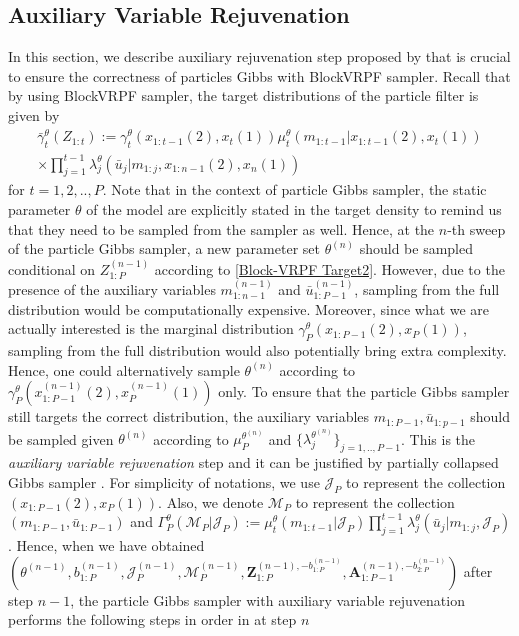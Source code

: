 \documentclass[12pt,a4paper]{article}
\begin{document}
\subsection{Auxiliary Variable Rejuvenation}
In this section, we describe auxiliary rejuvenation step proposed by \cite{finke2014static} that is crucial to ensure the correctness of particles Gibbs with BlockVRPF sampler. Recall that by using BlockVRPF sampler, the target distributions of the particle filter is given by 
\begin{multline}
    \label{Block-VRPF Target2}
    \bar{\gamma}_t^{\theta}\left(Z_{1:t}\right) := \gamma_t^{\theta}(x_{1:t-1}(2),x_t(1))\mu_t^{\theta}\left(m_{1:t-1}|x_{1:t-1}(2),x_t(1)\right)\\
    \times \prod_{j=1}^{t-1} \lambda_j^{\theta}\left(\bar{u}_{j} | m_{1:j},x_{1:n-1}(2),x_n(1)\right) 
\end{multline}
for \(t = 1,2,..,P\). Note that in the context of particle Gibbs sampler, the static parameter \(\theta\) of the model are explicitly stated in the target density to remind us that they need to be sampled from the sampler as well. Hence, at the \(n\)-th sweep of the particle Gibbs sampler, a new parameter set \(\theta^{(n)}\) should be sampled conditional on \(Z_{1:P}^{(n-1)}\) according to \eqref{Block-VRPF Target2}. However, due to the presence of the auxiliary variables \(m_{1:n-1}^{(n-1)}\) and \(\bar{u}_{1:P-1}^{(n-1)}\), sampling from the full distribution would be computationally expensive. Moreover, since what we are actually interested is the marginal distribution \(\gamma_P^{\theta}(x_{1:P-1}(2),x_P(1))\), sampling from the full distribution would also potentially bring extra complexity. Hence, one could alternatively sample \(\theta^{(n)}\) according to \(\gamma_P^{\theta}(x_{1:P-1}^{(n-1)}(2),x_P^{(n-1)}(1))\) only. To ensure that the particle Gibbs sampler still targets the correct distribution, the auxiliary variables \(m_{1:P-1},\bar{u}_{1:p-1}\) should be sampled given \(\theta^{(n)}\) according to \(\mu_P^{\theta^{(n)}}\) and \(\{\lambda_j^{\theta^{(n)}}\}_{j=1,..,P-1}\). This is the \textit{auxiliary variable rejuvenation} step and it can be justified by partially collapsed Gibbs sampler \citep{liu1994covariance,van2008partially}. For simplicity of notations, we use \(\mathcal{J}_P\) to represent the collection \((x_{1:P-1}(2),x_P(1))\). Also, we denote \(\mathcal{M}_P\) to represent the collection \((m_{1:P-1},\bar{u}_{1:P-1})\) and \(\Gamma_P^{\theta}(\mathcal{M}_P|\mathcal{J}_P):= \mu_t^{\theta}\left(m_{1:t-1}|\mathcal{J}_P\right)\prod_{j=1}^{t-1} \lambda_j^{\theta}\left(\bar{u}_{j} | m_{1:j},\mathcal{J}_P\right)\). Hence, when we have obtained \((\theta^{(n-1)},b_{1:P}^{(n-1)},\mathcal{J}_P^{(n-1)},\mathcal{M}_P^{(n-1)},\mathbf{Z}_{1:P}^{(n-1),-b_{1:P}^{(n-1)}},\mathbf{A}_{1:P-1}^{(n-1),-b_{2:P}^{(n-1)}})\) after step \(n-1\), the particle Gibbs sampler with auxiliary variable rejuvenation performs the following steps in order in at step \(n\)
\end{document}
